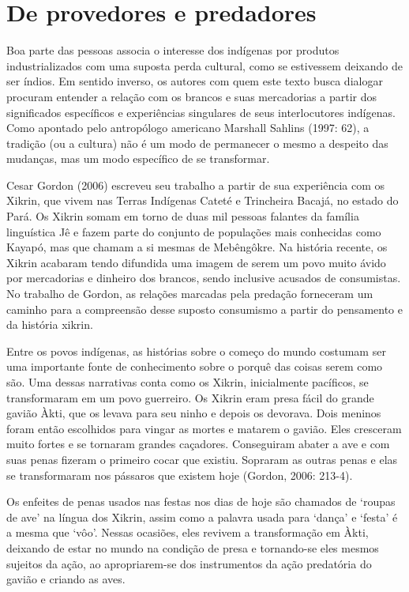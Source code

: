 \section{De provedores e predadores} 

Boa parte das pessoas associa o interesse dos indígenas por produtos
industrializados com uma suposta perda cultural, como se estivessem
deixando de ser índios. Em sentido inverso, os autores com quem este
texto busca dialogar procuram entender a relação com os brancos e suas
mercadorias a partir dos significados específicos e experiências
singulares de seus interlocutores indígenas. Como apontado pelo
antropólogo americano Marshall Sahlins (1997: 62), a tradição (ou a
cultura) não é um modo de permanecer o mesmo a despeito das mudanças,
mas um modo específico de se transformar.

Cesar Gordon (2006) escreveu seu trabalho a partir de sua experiência
com os Xikrin, que vivem nas Terras Indígenas Cateté e Trincheira
Bacajá, no estado do Pará. Os Xikrin somam em torno de duas mil pessoas
falantes da família linguística Jê e fazem parte do conjunto de
populações mais conhecidas como Kayapó, mas que chamam a si mesmas de
Mebêngôkre. Na história recente, os Xikrin acabaram tendo difundida uma
imagem de serem um povo muito ávido por mercadorias e dinheiro dos
brancos, sendo inclusive acusados de consumistas. No trabalho de
Gordon, as relações marcadas pela predação forneceram um caminho para a
compreensão desse suposto consumismo a partir do pensamento e da
história xikrin.

Entre os povos indígenas, as histórias sobre o começo do mundo costumam
ser uma importante fonte de conhecimento sobre o porquê das coisas
serem como são. Uma dessas narrativas conta como os Xikrin,
inicialmente pacíficos, se transformaram em um povo guerreiro. Os
Xikrin eram presa fácil do grande gavião Àkti, que os levava para seu
ninho e depois os devorava. Dois meninos foram então escolhidos para
vingar as mortes e matarem o gavião. Eles cresceram muito fortes e se
tornaram grandes caçadores. Conseguiram abater a ave e com suas penas
fizeram o primeiro cocar que existiu. Sopraram as outras penas e elas
se transformaram nos pássaros que existem hoje (Gordon, 2006: 213-4). 

Os enfeites de penas usados nas festas nos dias de hoje são chamados de
‘roupas de ave’ na língua dos Xikrin, assim como a palavra usada para
‘dança’ e ‘festa’ é a mesma que ‘vôo’. Nessas ocasiões, eles revivem a
transformação em Àkti, deixando de estar no mundo na condição de presa
e tornando-se eles mesmos sujeitos da ação, ao apropriarem-se dos
instrumentos da ação predatória do gavião e criando as aves.

